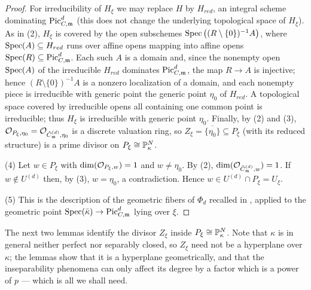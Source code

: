 \begin{proof}
    For irreducibility of $H_\xi$ we may replace $H$ by $H_{red}$, an integral scheme dominating
    $\PicCm[d]$ (this does not change the underlying topological space of $H_\xi$). As in (2),
    $H_\xi$ is covered by the open subschemes $\Spec\left((R\setminus\{0\})^{-1}A\right)$, where
    $\Spec(A) \subseteq H_{red}$ runs over affine opens mapping into affine opens
    $\Spec(R) \subseteq \PicCm[d]$. Each such $A$ is a domain and, since the nonempty open
    $\Spec(A)$ of the irreducible $H_{red}$ dominates $\PicCm[d]$, the map $R \to A$ is
    injective; hence $(R\setminus\{0\})^{-1}A$ is a nonzero localization of a domain, and each
    nonempty piece is irreducible with generic point the generic point $\eta_0$ of $H_{red}$.
    A topological space covered by irreducible opens all containing one common point is
    irreducible; thus $H_\xi$ is irreducible with generic point $\eta_0$. Finally, by (2) and
    (3),
    $\Oo_{P_\xi, \eta_0} = \Oo_{\Cmod{d}, \eta_0}$ is a discrete valuation ring, so
    $Z_\xi = \overline{\{\eta_0\}} \subseteq P_\xi$ (with its reduced structure) is a prime
    divisor on $P_\xi \cong \bP^N_\kappa$.

    (4) Let $w \in P_\xi$ with $\dim(\Oo_{P_\xi, w}) = 1$ and $w \neq \eta_0$. By (2),
    $\dim(\Oo_{\Cmod{d}, w}) = 1$. If $w \notin U^{(d)}$ then, by
    (3), $w = \eta_0$, a contradiction. Hence
    $w \in U^{(d)} \cap P_\xi = U_\xi$.

    (5) This is the description of the geometric fibers of $\Phi_d$ recalled in
    , applied to the geometric point
    $\Spec(\bar{\kappa}) \to \PicCm[d]$ lying over $\xi$.
\end{proof}

The next two lemmas identify the divisor $Z_\xi$ inside $P_\xi \cong \bP^N_\kappa$. Note that
$\kappa$ is in general neither perfect nor separably closed, so $Z_\xi$ need not be a
hyperplane over $\kappa$; the lemmas show that it is a hyperplane geometrically, and that the
inseparability phenomena can only affect its degree by a factor which is a power of $p$ ---
which is all we shall need.

